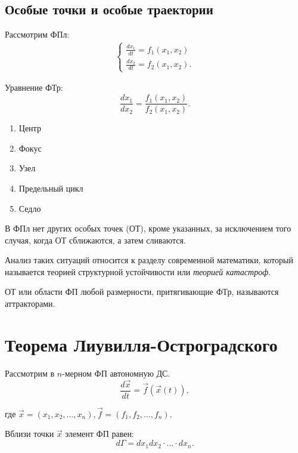 \subsection{Особые точки и особые траектории}

Рассмотрим ФПл:
\begin{eqnarray*}
	\begin{cases}
		\frac{dx_1}{dt}=f_1(x_1, x_2) \\
		\frac{dx_2}{dt}=f_2(x_1, x_2).
	\end{cases}
\end{eqnarray*}

Уравнение ФТр:
\begin{equation*}
	\frac{dx_1}{dx_2}=\frac{f_1(x_1, x_2)}{f_2(x_1, x_2)}.
\end{equation*}

\begin{enumerate}
	\item Центр
	\item Фокус
	\item Узел
	\item Предельный цикл
	\item Седло
\end{enumerate}

В ФПл нет других особых точек (ОТ), кроме указанных, за исключением того случая, когда ОТ сближаются, а затем сливаются.

Анализ таких ситуаций относится к разделу современной математики, который называется теорией структурной устойчивости или \textit{теорией катастроф}.

\begin{definition}[Аттрактор]
	ОТ или области ФП любой размерности, притягивающие ФТр, называются аттракторами.
\end{definition}

\section{Теорема Лиувилля-Остроградского}

Рассмотрим в $n$-мерном ФП автономную ДС.
\begin{equation}\label{eq:moving}
	\frac{d\vec{x}}{dt}=\vec{f}(\vec{x}(t)),
\end{equation}

где $\vec{x}=(x_1, x_2, \ldots, x_n), \vec{f}=(f_1, f_2, \ldots, f_n)$.

Вблизи точки $\vec{x}$ элемент ФП равен:
\begin{equation*}
	d\Gamma=dx_1 dx_2 \cdot \ldots \cdot dx_n.
\end{equation*}

